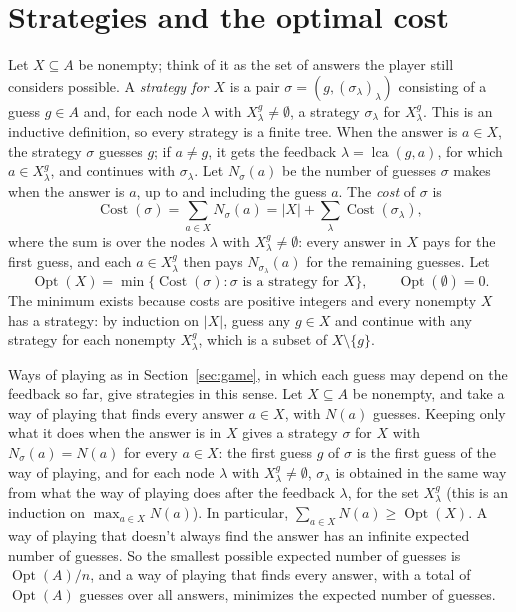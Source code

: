 \documentclass[11pt]{article}
\newcommand{\lca}{\operatorname{lca}}
\newcommand{\Opt}{\operatorname{Opt}}
\newcommand{\Cost}{\operatorname{Cost}}
\begin{document}
\section{Strategies and the optimal cost}
\label{sec:strategies}

Let $X \subseteq A$ be nonempty; think of it as the set of answers the player
still considers possible. A \emph{strategy for $X$} is a pair
$\sigma = (g, (\sigma_\lambda)_\lambda)$ consisting of a guess $g \in A$ and, for
each node $\lambda$ with $X^g_\lambda \ne \emptyset$, a strategy $\sigma_\lambda$
for $X^g_\lambda$. This is an inductive definition, so every strategy is a finite
tree. When the answer is $a \in X$, the strategy $\sigma$ guesses $g$; if
$a \ne g$, it gets the feedback $\lambda = \lca(g, a)$, for which
$a \in X^g_\lambda$, and continues with $\sigma_\lambda$. Let $N_\sigma(a)$ be the
number of guesses $\sigma$ makes when the answer is $a$, up to and including the
guess $a$. The \emph{cost} of $\sigma$ is
\[
  \Cost(\sigma) = \sum_{a \in X} N_\sigma(a)
  = |X| + \sum_\lambda \Cost(\sigma_\lambda),
\]
where the sum is over the nodes $\lambda$ with $X^g_\lambda \ne \emptyset$: every
answer in $X$ pays for the first guess, and each $a \in X^g_\lambda$ then pays
$N_{\sigma_\lambda}(a)$ for the remaining guesses. Let
\[
  \Opt(X) = \min \{\Cost(\sigma) : \sigma \text{ is a strategy for } X\},
  \qquad
  \Opt(\emptyset) = 0.
\]
The minimum exists because costs are positive integers and every nonempty $X$
has a strategy: by induction on $|X|$, guess any $g \in X$ and continue with any
strategy for each nonempty $X^g_\lambda$, which is a subset of
$X \setminus \{g\}$.

Ways of playing as in Section~\ref{sec:game}, in which each guess may depend on
the feedback so far, give strategies in this sense. Let $X \subseteq A$ be
nonempty, and take a way of playing that finds every answer $a \in X$, with
$N(a)$ guesses. Keeping only what it does when the answer is in $X$ gives a
strategy $\sigma$ for $X$ with $N_\sigma(a) = N(a)$ for every $a \in X$: the
first guess $g$ of $\sigma$ is the first guess of the way of playing, and for each
node $\lambda$ with $X^g_\lambda \ne \emptyset$, $\sigma_\lambda$ is obtained in
the same way from what the way of playing does after the feedback $\lambda$, for
the set $X^g_\lambda$ (this is an induction on $\max_{a \in X} N(a)$). In
particular, $\sum_{a \in X} N(a) \ge \Opt(X)$. A way of playing that doesn't
always find the answer has an infinite expected number of guesses. So the smallest
possible expected number of guesses is $\Opt(A)/n$, and a way of playing that
finds every answer, with a total of $\Opt(A)$ guesses over all answers, minimizes
the expected number of guesses.
\end{document}
